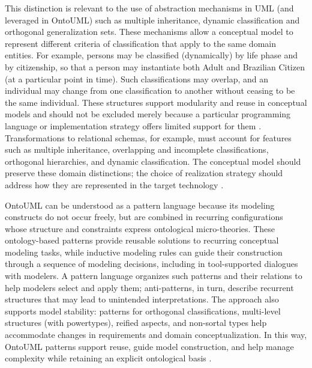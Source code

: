 This distinction is relevant to the use of abstraction mechanisms in UML (and leveraged in OntoUML) such as multiple inheritance, dynamic classification and orthogonal generalization sets. These mechanisms allow a conceptual model to represent different criteria of classification that apply to the same domain entities. For example, persons may be classified (dynamically) by life phase and by citizenship, so that a person may instantiate both Adult and Brazilian Citizen (at a particular point in time). Such classifications may overlap, and an individual may change from one classification to another without ceasing to be the same individual. These structures support modularity and reuse in conceptual models and should not be excluded merely because a particular programming language or implementation strategy offers limited support for them \cite{guidoni_almeida_guizzardi_2020_relational_schemas}. Transformations to relational schemas, for example, must account for features such as multiple inheritance, overlapping and incomplete classifications, orthogonal hierarchies, and dynamic classification. The conceptual model should preserve these domain distinctions; the choice of realization strategy should address how they are represented in the target technology \cite{guidoni_almeida_guizzardi_2020_relational_schemas}.

OntoUML can be understood as a pattern language because its modeling constructs do not occur freely, but are combined in recurring configurations whose structure and constraints express ontological micro-theories. These ontology-based patterns provide reusable solutions to recurring conceptual modeling tasks, while inductive modeling rules can guide their construction through a sequence of modeling decisions, including in tool-supported dialogues with modelers. A pattern language organizes such patterns and their relations to help modelers select and apply them; anti-patterns, in turn, describe recurrent structures that may lead to unintended interpretations. The approach also supports model stability: patterns for orthogonal classifications, multi-level structures (with powertypes), reified aspects, and non-sortal types help accommodate changes in requirements and domain conceptualization. In this way, OntoUML patterns support reuse, guide model construction, and help manage complexity while retaining an explicit ontological basis \cite{guizzardi_gracas_guizzardi_2011_ontouml_patterns,guizzardi_2014_ontological_patterns,guizzardi_almeida_2020_stability_patterns,carvalho_almeida_guizzardi_2016_powertype_pattern}.